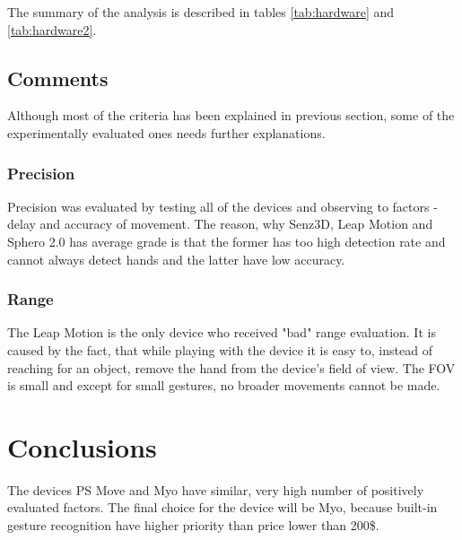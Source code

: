 The summary of the analysis is described in tables \ref{tab:hardware} and \ref{tab:hardware2}.

\subsection{Comments}
Although most of the criteria has been explained in previous section, some of the experimentally evaluated ones needs further explanations.
\subsubsection{Precision}
Precision was evaluated by testing all of the devices and observing to factors - delay and accuracy of movement. The reason, why Senz3D, Leap Motion and Sphero 2.0 has average grade is that the former has too high detection rate and cannot always detect hands and the latter have low accuracy.
\subsubsection{Range}
The Leap Motion is the only device who received "bad" range evaluation. It is caused by the fact, that while playing with the device it is easy to, instead of reaching for an object, remove the hand from the device's field of view. The FOV is small and except for small gestures, no broader movements cannot be made.

\section{Conclusions}
The devices PS Move and Myo have similar, very high number of positively evaluated factors. The final choice for the device will be Myo, because built-in gesture recognition have higher priority than price lower than 200\$. 

